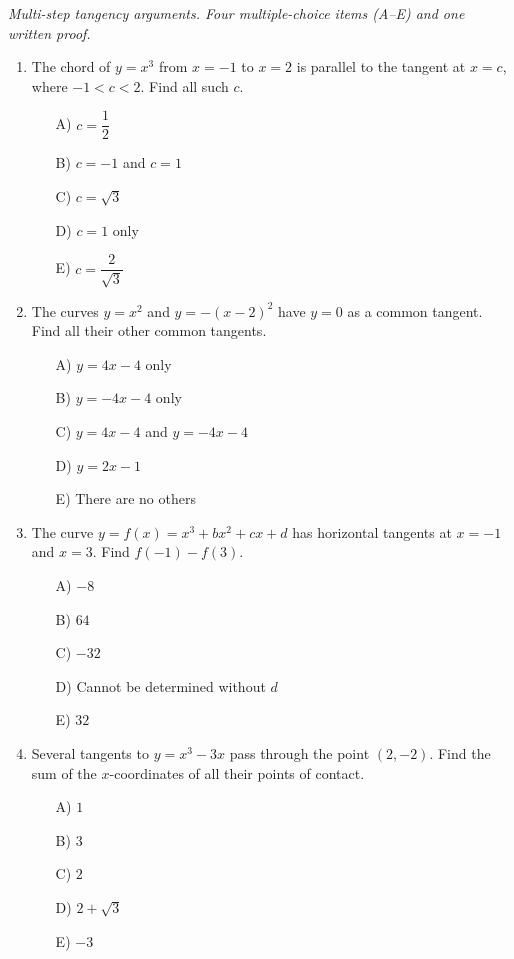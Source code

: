 \documentclass[11pt,a4paper]{article}
\begin{document}
\noindent\textit{Multi-step tangency arguments. Four multiple-choice items (A--E) and one written proof.}

\begin{enumerate}

\item The chord of $y=x^3$ from $x=-1$ to $x=2$ is parallel to the tangent at $x=c$, where $-1<c<2$. Find all such $c$.
\begin{itemize}
\item[A)] $c=\dfrac12$
\item[B)] $c=-1$ and $c=1$
\item[C)] $c=\sqrt3$
\item[D)] $c=1$ only
\item[E)] $c=\dfrac{2}{\sqrt3}$
\end{itemize}

\item The curves $y=x^2$ and $y=-(x-2)^2$ have $y=0$ as a common tangent. Find all their other common tangents.
\begin{itemize}
\item[A)] $y=4x-4$ only
\item[B)] $y=-4x-4$ only
\item[C)] $y=4x-4$ and $y=-4x-4$
\item[D)] $y=2x-1$
\item[E)] There are no others
\end{itemize}

\item The curve $y=f(x)=x^3+bx^2+cx+d$ has horizontal tangents at $x=-1$ and $x=3$. Find $f(-1)-f(3)$.
\begin{itemize}
\item[A)] $-8$
\item[B)] $64$
\item[C)] $-32$
\item[D)] Cannot be determined without $d$
\item[E)] $32$
\end{itemize}

\item Several tangents to $y=x^3-3x$ pass through the point $(2,-2)$. Find the sum of the $x$-coordinates of all their points of contact.
\begin{itemize}
\item[A)] $1$
\item[B)] $3$
\item[C)] $2$
\item[D)] $2+\sqrt3$
\item[E)] $-3$
\end{itemize}


\end{enumerate}
\end{document}
